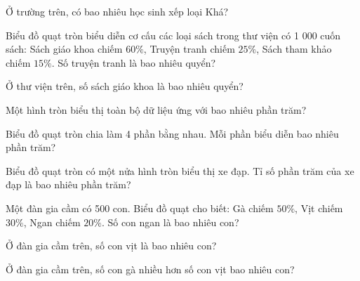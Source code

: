 \begin{ex}
  Ở trường trên, có bao nhiêu học sinh xếp loại Khá?
\end{ex}

\begin{ex}
  Biểu đồ quạt tròn biểu diễn cơ cấu các loại sách trong thư viện có 1 000 cuốn sách: Sách giáo khoa chiếm $60\%$, Truyện tranh chiếm $25\%$, Sách tham khảo chiếm $15\%$. Số truyện tranh là bao nhiêu quyển?
\end{ex}

\begin{ex}
  Ở thư viện trên, số sách giáo khoa là bao nhiêu quyển?
\end{ex}

\begin{ex}
  Một hình tròn biểu thị toàn bộ dữ liệu ứng với bao nhiêu phần trăm?
\end{ex}

\begin{ex}
  Biểu đồ quạt tròn chia làm 4 phần bằng nhau. Mỗi phần biểu diễn bao nhiêu phần trăm?
\end{ex}

\begin{ex}
  Biểu đồ quạt tròn có một nửa hình tròn biểu thị xe đạp. Tỉ số phần trăm của xe đạp là bao nhiêu phần trăm?
\end{ex}

\begin{ex}
  Một đàn gia cầm có 500 con. Biểu đồ quạt cho biết: Gà chiếm $50\%$, Vịt chiếm $30\%$, Ngan chiếm $20\%$. Số con ngan là bao nhiêu con?
\end{ex}

\begin{ex}
  Ở đàn gia cầm trên, số con vịt là bao nhiêu con?
\end{ex}

\begin{ex}
  Ở đàn gia cầm trên, số con gà nhiều hơn số con vịt bao nhiêu con?
\end{ex}

